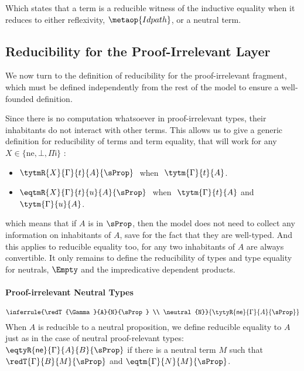 Which states that a term is a reducible witness of the inductive equality when it
reduces to either reflexivity, \( \metaop{Idpath} \), or a neutral term.

\subsection{Reducibility for the Proof-Irrelevant Layer}

We now turn to the definition of reducibility for the proof-irrelevant
fragment, which must be defined independently from the rest of the model
to ensure a well-founded definition.

Since there is no computation whatsoever in proof-irrelevant types,
their inhabitants do not interact with other terms. This allows us
to give a generic definition for reducibility of terms and term
equality, that will work for any \( X \in \{ \mathrm{ne}, \bot, {\Pi \mathsf{i}}\} \) :
%
\begin{itemize}
  \item \( \tytmR{X}{\Gamma}{t}{A}{\sProp}\ \) when \(\ \tytm{\Gamma}{t}{A} \).
  \item \( \eqtmR{X}{\Gamma}{t}{u}{A}{\sProp}\ \) when \(\ \tytm{\Gamma}{t}{A} \) and \( \tytm{\Gamma}{u}{A} \).
  \end{itemize}
%
which means that if \( A \) is in \( \sProp \), then the model does not
need to collect any information on inhabitants of
\( A \), save for the fact that they are well-typed. And this applies
to reducible equality too, for any two inhabitants of \( A \) are always
convertible.
% 
It only remains to define the reducibility of types and type equality
for neutrals, $\Empty$ and the impredicative dependent products.

\paragraph{Proof-irrelevant Neutral Types}

\[
  \inferrule{\redT{\Gamma}{A}{N}{\sProp} \\ \neutral{N}}
  {\tytyR{\mathsf{ne}}{\Gamma}{A}{\sProp}}
\]
When $A$ is reducible to a neutral proposition, we define 
reducible equality to \( A \) just as in the case of neutral 
proof-relevant types: 
\( \eqtyR{\mathsf{ne}}{\Gamma}{A}{B}{\sProp} \) if there is 
a neutral term \( M \) such that \( \redT{\Gamma}{B}{M}{\sProp} \) 
and \( \eqtm{\Gamma}{N}{M}{\sProp} \).

